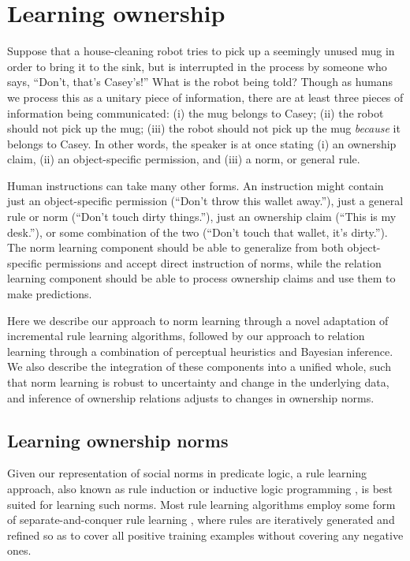 \documentclass[letterpaper]{article} %
\begin{document}
\section{Learning ownership}

Suppose that a house-cleaning robot tries to pick up a seemingly unused mug in order to bring it to the sink, but is interrupted in the process by someone who says, ``Don't, that's Casey's!'' What is the robot being told? Though as humans we process this as a unitary piece of information, there are at least three pieces of information being communicated: (i) the mug belongs to Casey; (ii) the robot should not pick up the mug; (iii) the robot should not pick up the mug \emph{because} it belongs to Casey. In other words, the speaker is at once stating (i) an ownership claim, (ii) an object-specific permission, and (iii) a norm, or general rule.

Human instructions can take many other forms. An instruction might contain just an object-specific permission (``Don't throw this wallet away.''), just a general rule or norm (``Don't touch dirty things.''), just an ownership claim (``This is my desk.''), or some combination of the two (``Don't touch that wallet, it's dirty.''). The norm learning component should be able to generalize from both object-specific permissions and accept direct instruction of norms, while the relation learning component should be able to process ownership claims and use them to make predictions.

Here we describe our approach to norm learning through a novel adaptation of incremental rule learning algorithms, followed by our approach to relation learning through a combination of perceptual heuristics and Bayesian inference. We also describe the integration of these components into a unified whole, such that norm learning is robust to uncertainty and change in the underlying data, and inference of ownership relations adjusts to changes in ownership norms.

\subsection{Learning ownership norms}

Given our representation of social norms in predicate logic, a rule learning approach, also known as rule induction \cite{clark1991rule} or inductive logic programming \cite{muggleton1991inductive}, is best suited for learning such norms. Most rule learning algorithms employ some form of separate-and-conquer rule learning \cite{furnkranz1999separate}, where rules are iteratively generated and refined so as to cover all positive training examples without covering any negative ones.
\end{document}
